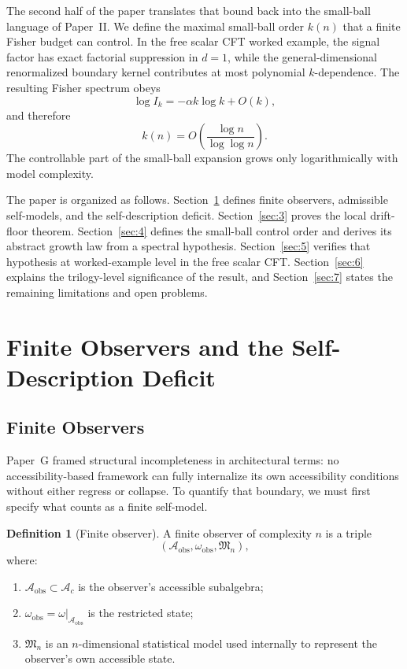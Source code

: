 \documentclass[12pt]{article}
\theoremstyle{definition}
\newtheorem{definition}[theorem]{Definition}
\theoremstyle{remark}
\begin{document}
The second half of the paper translates that bound back into the
small-ball language of Paper~II. We define the maximal small-ball order
\(k(n)\) that a finite Fisher budget can control. In the free scalar
CFT worked example, the signal factor has exact factorial suppression in
\(d=1\), while the general-dimensional renormalized boundary kernel
contributes at most polynomial \(k\)-dependence. The resulting Fisher
spectrum obeys
\[
\log I_k = -\alpha k\log k + O(k),
\]
and therefore
\[
k(n)=O\!\left(\frac{\log n}{\log\log n}\right).
\]
The controllable part of the small-ball expansion grows only
logarithmically with model complexity.

The paper is organized as follows. Section~\ref{sec:2} defines finite
observers, admissible self-models, and the self-description deficit.
Section~\ref{sec:3} proves the local drift-floor theorem. Section~\ref{sec:4}
defines the small-ball control order and derives its abstract growth
law from a spectral hypothesis. Section~\ref{sec:5} verifies that
hypothesis at worked-example level in the free scalar CFT. Section~\ref{sec:6}
explains the trilogy-level significance of the result, and
Section~\ref{sec:7} states the remaining limitations and open problems.

\section{Finite Observers and the Self-Description Deficit}\label{sec:2}

\subsection{Finite Observers}\label{subsec:2.1}

Paper~G\cite{PaperG} framed structural incompleteness in architectural
terms: no accessibility-based framework can fully internalize its own
accessibility conditions without either regress or collapse. To
quantify that boundary, we must first specify what counts as a finite
self-model.

\begin{definition}[Finite observer]\label{def:2.1}
A finite observer of complexity \(n\) is a triple
\[
(\mathcal{A}_{\mathrm{obs}},\omega_{\mathrm{obs}},\mathfrak{M}_n),
\]
where:
\begin{enumerate}
\item \(\mathcal{A}_{\mathrm{obs}} \subset \mathcal{A}_c\) is the
observer's accessible subalgebra;
\item \(\omega_{\mathrm{obs}} = \omega|_{\mathcal{A}_{\mathrm{obs}}}\)
is the restricted state;
\item \(\mathfrak{M}_n\) is an \(n\)-dimensional statistical model used
internally to represent the observer's own accessible state.
\end{enumerate}
\end{definition}
\end{document}
